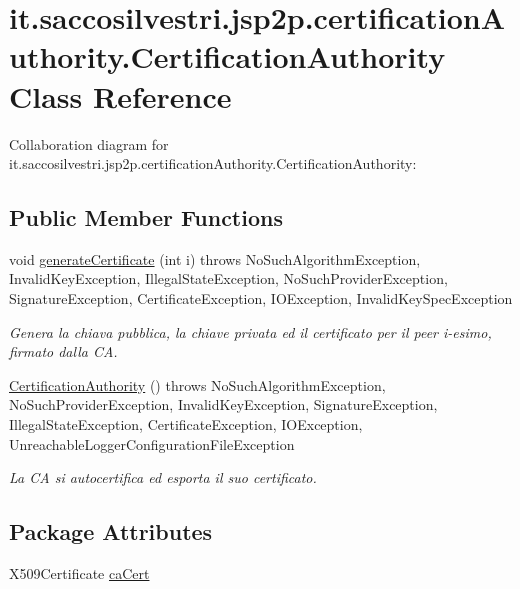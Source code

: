 \hypertarget{classit_1_1saccosilvestri_1_1jsp2p_1_1certification_authority_1_1_certification_authority}{
\section{it.saccosilvestri.jsp2p.certification\-Authority.\-Certification\-Authority \-Class \-Reference}
\label{classit_1_1saccosilvestri_1_1jsp2p_1_1certification_authority_1_1_certification_authority}
}


\-Collaboration diagram for it.saccosilvestri.jsp2p.certification\-Authority.\-Certification\-Authority\-:
\subsection*{\-Public \-Member \-Functions}
\begin{DoxyCompactItemize}
\item 
void \hyperlink{classit_1_1saccosilvestri_1_1jsp2p_1_1certification_authority_1_1_certification_authority_acac40170eef762342866fedbee961113}{generate\-Certificate} (int i)  throws No\-Such\-Algorithm\-Exception, 			\-Invalid\-Key\-Exception, Illegal\-State\-Exception, 			\-No\-Such\-Provider\-Exception, Signature\-Exception, Certificate\-Exception, 			\-I\-O\-Exception, Invalid\-Key\-Spec\-Exception 
\begin{DoxyCompactList}\small\item\em \-Genera la chiava pubblica, la chiave privata ed il certificato per il peer i-\/esimo, firmato dalla \-C\-A. \end{DoxyCompactList}\item 
\hyperlink{classit_1_1saccosilvestri_1_1jsp2p_1_1certification_authority_1_1_certification_authority_a137882977c0e3dceef9c8ba7ebdf2dab}{\-Certification\-Authority} ()  throws No\-Such\-Algorithm\-Exception, 			\-No\-Such\-Provider\-Exception, Invalid\-Key\-Exception, Signature\-Exception, 			\-Illegal\-State\-Exception, Certificate\-Exception, I\-O\-Exception, Unreachable\-Logger\-Configuration\-File\-Exception 
\begin{DoxyCompactList}\small\item\em \-La \-C\-A si autocertifica ed esporta il suo certificato. \end{DoxyCompactList}\end{DoxyCompactItemize}
\subsection*{\-Package \-Attributes}
\begin{DoxyCompactItemize}
\item 
\-X509\-Certificate \hyperlink{classit_1_1saccosilvestri_1_1jsp2p_1_1certification_authority_1_1_certification_authority_a778a02a715b6e7fdbcb65edb08c211e8}{ca\-Cert}
\end{DoxyCompactItemize}


